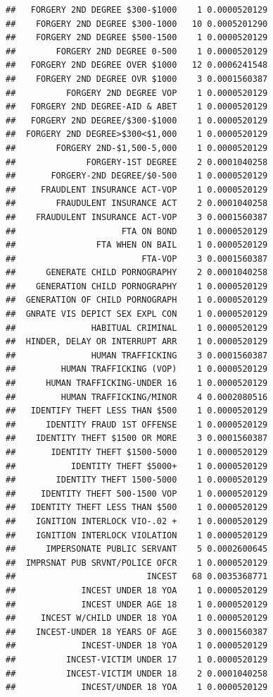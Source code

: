 \documentclass[]{book}
\begin{document}
\begin{verbatim}
##   FORGERY 2ND DEGREE $300-$1000    1 0.0000520129
##    FORGERY 2ND DEGREE $300-1000   10 0.0005201290
##    FORGERY 2ND DEGREE $500-1500    1 0.0000520129
##        FORGERY 2ND DEGREE 0-500    1 0.0000520129
##   FORGERY 2ND DEGREE OVER $1000   12 0.0006241548
##    FORGERY 2ND DEGREE OVR $1000    3 0.0001560387
##          FORGERY 2ND DEGREE VOP    1 0.0000520129
##   FORGERY 2ND DEGREE-AID & ABET    1 0.0000520129
##   FORGERY 2ND DEGREE/$300-$1000    1 0.0000520129
##  FORGERY 2ND DEGREE>$300<$1,000    1 0.0000520129
##        FORGERY 2ND-$1,500-5,000    1 0.0000520129
##              FORGERY-1ST DEGREE    2 0.0001040258
##       FORGERY-2ND DEGREE/$0-500    1 0.0000520129
##     FRAUDLENT INSURANCE ACT-VOP    1 0.0000520129
##        FRAUDULENT INSURANCE ACT    2 0.0001040258
##    FRAUDULENT INSURANCE ACT-VOP    3 0.0001560387
##                     FTA ON BOND    1 0.0000520129
##                FTA WHEN ON BAIL    1 0.0000520129
##                         FTA-VOP    3 0.0001560387
##      GENERATE CHILD PORNOGRAPHY    2 0.0001040258
##    GENERATION CHILD PORNOGRAPHY    1 0.0000520129
##  GENERATION OF CHILD PORNOGRAPH    1 0.0000520129
##  GNRATE VIS DEPICT SEX EXPL CON    1 0.0000520129
##               HABITUAL CRIMINAL    1 0.0000520129
##  HINDER, DELAY OR INTERRUPT ARR    1 0.0000520129
##               HUMAN TRAFFICKING    3 0.0001560387
##         HUMAN TRAFFICKING (VOP)    1 0.0000520129
##      HUMAN TRAFFICKING-UNDER 16    1 0.0000520129
##         HUMAN TRAFFICKING/MINOR    4 0.0002080516
##   IDENTIFY THEFT LESS THAN $500    1 0.0000520129
##      IDENTITY FRAUD 1ST OFFENSE    1 0.0000520129
##    IDENTITY THEFT $1500 OR MORE    3 0.0001560387
##       IDENTITY THEFT $1500-5000    1 0.0000520129
##           IDENTITY THEFT $5000+    1 0.0000520129
##        IDENTITY THEFT 1500-5000    1 0.0000520129
##     IDENTITY THEFT 500-1500 VOP    1 0.0000520129
##   IDENTITY THEFT LESS THAN $500    1 0.0000520129
##    IGNITION INTERLOCK VIO-.02 +    1 0.0000520129
##    IGNITION INTERLOCK VIOLATION    1 0.0000520129
##      IMPERSONATE PUBLIC SERVANT    5 0.0002600645
##  IMPRSNAT PUB SRVNT/POLICE OFCR    1 0.0000520129
##                          INCEST   68 0.0035368771
##             INCEST UNDER 18 YOA    1 0.0000520129
##             INCEST UNDER AGE 18    1 0.0000520129
##     INCEST W/CHILD UNDER 18 YOA    1 0.0000520129
##    INCEST-UNDER 18 YEARS OF AGE    3 0.0001560387
##             INCEST-UNDER 18 YOA    1 0.0000520129
##          INCEST-VICTIM UNDER 17    1 0.0000520129
##          INCEST-VICTIM UNDER 18    2 0.0001040258
##             INCEST/UNDER 18 YOA    1 0.0000520129

\end{verbatim}
\end{document}
